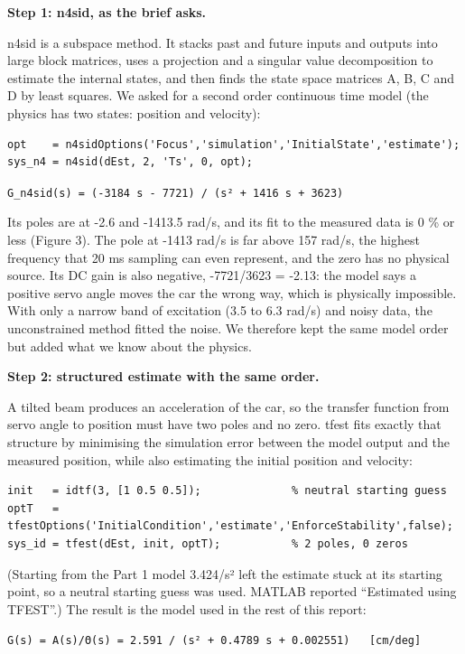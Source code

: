 \documentclass[11pt,a4paper]{article}
\begin{document}
\textbf{Step 1: n4sid, as the brief asks.}

n4sid is a subspace method. It stacks past and future inputs and outputs
into large block matrices, uses a projection and a singular value
decomposition to estimate the internal states, and then finds the state
space matrices A, B, C and D by least squares. We asked for a second
order continuous time model (the physics has two states: position and
velocity):

\begin{lstlisting}
opt    = n4sidOptions('Focus','simulation','InitialState','estimate');
sys_n4 = n4sid(dEst, 2, 'Ts', 0, opt);
\end{lstlisting}

\texttt{G\_n4sid(s)\ =\ (-3184\ s\ -\ 7721)\ /\ (s²\ +\ 1416\ s\ +\ 3623)}

Its poles are at -2.6 and -1413.5 rad/s, and its fit to the measured
data is 0 \% or less (Figure 3). The pole at -1413 rad/s is far above
157 rad/s, the highest frequency that 20 ms sampling can even represent,
and the zero has no physical source. Its DC gain is also negative, -7721/3623 = -2.13: the model says a positive servo angle moves the car the wrong way, which is physically impossible. With only a narrow band of
excitation (3.5 to 6.3 rad/s) and noisy data, the unconstrained method
fitted the noise. We therefore kept the same model order but added what
we know about the physics.

\textbf{Step 2: structured estimate with the same order.}

A tilted beam produces an acceleration of the car, so the transfer
function from servo angle to position must have two poles and no zero.
tfest fits exactly that structure by minimising the simulation error
between the model output and the measured position, while also
estimating the initial position and velocity:

\begin{lstlisting}
init   = idtf(3, [1 0.5 0.5]);              % neutral starting guess
optT   = tfestOptions('InitialCondition','estimate','EnforceStability',false);
sys_id = tfest(dEst, init, optT);           % 2 poles, 0 zeros
\end{lstlisting}

(Starting from the Part 1 model 3.424/s² left the estimate stuck at its
starting point, so a neutral starting guess was used. MATLAB reported
``Estimated using TFEST''.) The result is the model used in the rest of
this report:

\texttt{G(s)\ =\ A(s)/Θ(s)\ =\ 2.591\ /\ (s²\ +\ 0.4789\ s\ +\ 0.002551)\ \ \ {[}cm/deg{]}}
\end{document}
